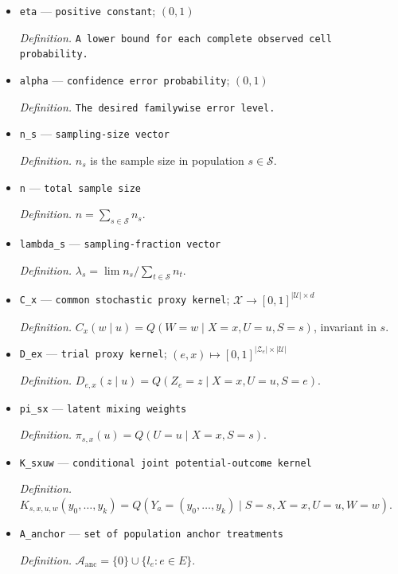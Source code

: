 \documentclass{article}
\begin{document}
\begin{itemize}
  \item \texttt{eta} --- \texttt{positive constant}; \((0,1)\)
  \par\smallskip\noindent\emph{Definition.} \texttt{A lower bound for each complete observed cell probability.}
  \item \texttt{alpha} --- \texttt{confidence error probability}; \((0,1)\)
  \par\smallskip\noindent\emph{Definition.} \texttt{The desired familywise error level.}
  \item \texttt{n\_\allowbreak{}s} --- \texttt{sampling-\allowbreak{}size vector}
  \par\smallskip\noindent\emph{Definition.} \(n_s\) is the sample size in population \(s\in\mathcal S\).
  \item \texttt{n} --- \texttt{total sample size}
  \par\smallskip\noindent\emph{Definition.} \(n=\sum_{s\in\mathcal S}n_s\).
  \item \texttt{lambda\_\allowbreak{}s} --- \texttt{sampling-\allowbreak{}fraction vector}
  \par\smallskip\noindent\emph{Definition.} \(\lambda_s=\lim n_s/\sum_{t\in\mathcal S}n_t\).
  \item \texttt{C\_\allowbreak{}x} --- \texttt{common stochastic proxy kernel}; \(\mathcal X\to[0,1]^{|\mathcal U|\times d}\)
  \par\smallskip\noindent\emph{Definition.} \(C_x(w\mid u)=Q(W=w\mid X=x,U=u,S=s)\), invariant in \(s\).
  \item \texttt{D\_\allowbreak{}ex} --- \texttt{trial proxy kernel}; \((e,x)\mapsto[0,1]^{|\mathcal Z_e|\times|\mathcal U|}\)
  \par\smallskip\noindent\emph{Definition.} \(D_{e,x}(z\mid u)=Q(Z_e=z\mid X=x,U=u,S=e)\).
  \item \texttt{pi\_\allowbreak{}sx} --- \texttt{latent mixing weights}
  \par\smallskip\noindent\emph{Definition.} \(\pi_{s,x}(u)=Q(U=u\mid X=x,S=s)\).
  \item \texttt{K\_\allowbreak{}sxuw} --- \texttt{conditional joint potential-\allowbreak{}outcome kernel}
  \par\smallskip\noindent\emph{Definition.} \(K_{s,x,u,w}(y_0,\ldots,y_k)=Q(Y_a=(y_0,\ldots,y_k)\mid S=s,X=x,U=u,W=w)\).
  \item \texttt{A\_\allowbreak{}anchor} --- \texttt{set of population anchor treatments}
  \par\smallskip\noindent\emph{Definition.} \(\mathcal A_{\mathrm{anc}}=\{0\}\cup\{l_e:e\in E\}\).

\end{itemize}
\end{document}
